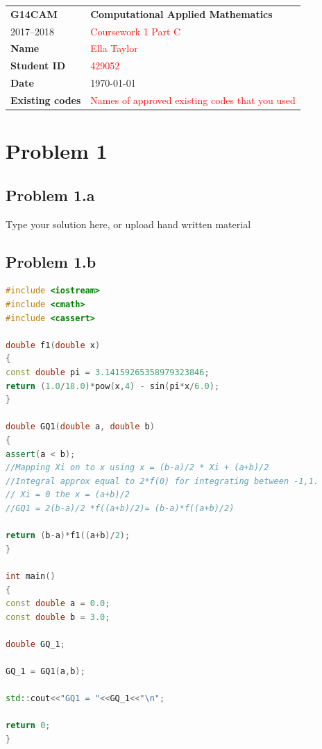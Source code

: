 \documentclass[a4paper,12pt,onecolumn,final]{article}
\begin{document}


\noindent
\begin{tabular}{|p{}|p{}|}
\hline
\textbf{G14CAM} & \textbf{Computational Applied Mathematics}
\\
2017--2018 & \textcolor{red}{Coursework 1 Part C}
\\
\hline
\textbf{Name} & \textcolor{red}{Ella Taylor}
\\ 
\textbf{Student ID} & \textcolor{red}{429052}
\\ 
\textbf{Date} & \today
\\
\hline
\textbf{Existing codes} & \textcolor{red}{Names of approved existing codes that you used}
\\
\hline
\end{tabular}
\section*{Problem 1}
\subsection*{Problem 1.a}
Type your solution here, or upload hand written material

\subsection*{Problem 1.b}
\begin{lstlisting}[language=C++]
#include <iostream>
#include <cmath>
#include <cassert>

double f1(double x)
{
const double pi = 3.14159265358979323846;
return (1.0/18.0)*pow(x,4) - sin(pi*x/6.0);
}

double GQ1(double a, double b)
{
assert(a < b);
//Mapping Xi on to x using x = (b-a)/2 * Xi + (a+b)/2
//Integral approx equal to 2*f(0) for integrating between -1,1.
// Xi = 0 the x = (a+b)/2
//GQ1 = 2(b-a)/2 *f((a+b)/2)= (b-a)*f((a+b)/2)

return (b-a)*f1((a+b)/2);
}

int main()
{
const double a = 0.0;
const double b = 3.0;

double GQ_1;

GQ_1 = GQ1(a,b);

std::cout<<"GQ1 = "<<GQ_1<<"\n";

return 0;
}

\end{lstlisting}%
\end{document}
